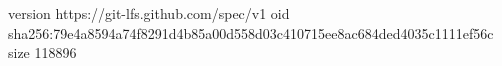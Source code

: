 version https://git-lfs.github.com/spec/v1
oid sha256:79e4a8594a74f8291d4b85a00d558d03c410715ee8ac684ded4035c1111ef56c
size 118896
